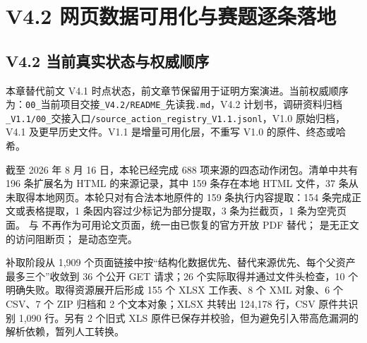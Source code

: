 
\part{V4.2 网页数据可用化与赛题逐条落地}

\chapter{V4.2 当前真实状态与权威顺序}

\begin{decisionbox}[当前状态替代规则]
本章替代前文 V4.1 时点状态，前文章节保留用于证明方案演进。当前权威顺序为：\texttt{00\_}当前项目交接\texttt{\_V4.2/README\_}先读我\texttt{.md}，V4.2 计划书，调研资料归档\texttt{\_V1.1/00\_}交接入口\texttt{/source\_action\_registry\_V1.1.jsonl}，V1.0 原始归档，V4.1 及更早历史文件。V1.1 是增量可用化层，不重写 V1.0 的原件、终态或哈希。
\end{decisionbox}

截至 2026 年 8 月 16 日，本轮已经完成 688 项来源的四态动作闭包。清单中共有 196 条扩展名为 HTML 的来源记录，其中 159 条存在本地 HTML 文件，37 条从未取得本地网页。本轮只对有合法本地原件的 159 条执行内容提取：154 条完成正文或表格提取，1 条因内容过少标记为部分提取，3 条为拦截页，1 条为空壳页面。 与  不再作为可用论文页面，统一由已恢复的官方开放 PDF  替代； 是无正文的访问阻断页； 是动态空壳。

补取阶段从 1,909 个页面链接中按“结构化数据优先、替代来源优先、每个父资产最多三个”收敛到 36 个公开 GET 请求；26 个实际取得并通过文件头检查，10 个明确失败。取得资源展开后形成 155 个 XLSX 工作表、8 个 XML 对象、6 个 CSV、7 个 ZIP 归档和 2 个文本对象；XLSX 共转出 124,178 行，CSV 原件共识别 1,090 行。另有 2 个旧式 XLS 原件已保存并校验，但为避免引入带高危漏洞的解析依赖，暂列人工转换。

